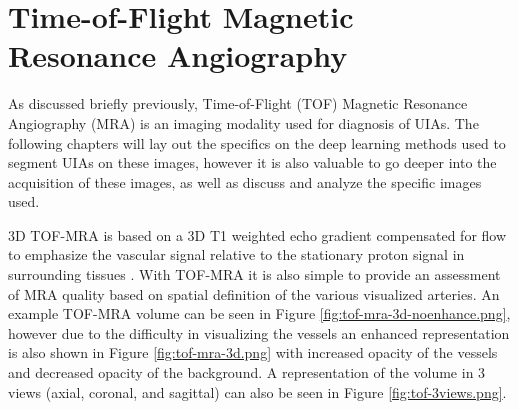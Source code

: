 \section{Time-of-Flight Magnetic Resonance Angiography}
\label{chapter3}

As discussed briefly previously, Time-of-Flight (TOF) Magnetic Resonance Angiography (MRA) is an imaging modality used for diagnosis of UIAs. The following chapters will lay out the specifics on the deep learning methods used to segment UIAs on these images, however it is also valuable to go deeper into the acquisition of these images, as well as discuss and analyze the specific images used.

3D TOF-MRA is based on a 3D T1 weighted echo gradient compensated for flow to emphasize the vascular signal relative to the stationary proton signal in surrounding tissues \cite{Rodriguez-Regent2014}. With TOF-MRA it is also simple to provide an assessment of MRA quality based on spatial definition of the various visualized arteries. An example TOF-MRA volume can be seen in Figure \ref{fig:tof-mra-3d-noenhance.png}, however due to the difficulty in visualizing the vessels an enhanced representation is also shown in Figure \ref{fig:tof-mra-3d.png} with increased opacity of the vessels and decreased opacity of the background. A representation of the volume in 3 views (axial, coronal, and sagittal) can also be seen in Figure \ref{fig:tof-3views.png}.

